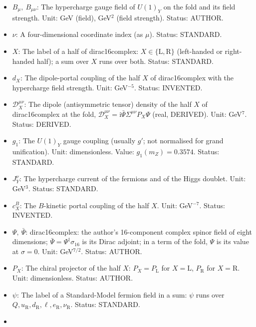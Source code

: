 \documentclass[
  10pt,
]{article}
\begin{document}
\begin{itemize}
  \(W\) and \(B\)): the gauge couplings at the fold are divided by the
  square root of the portal factor. Unit: dimensionless. Value: 1 where
  dirac16complex vanishes. Status: DERIVED.
\item
  \(B_\mu,\ B_{\mu\nu}\): The hypercharge gauge field of \(U(1)_Y\) on
  the fold and its field strength. Unit: GeV (field), GeV\(^2\) (field
  strength). Status: AUTHOR.
\item
  \(\nu\): A four-dimensional coordinate index (as \(\mu\)). Status:
  STANDARD.
\item
  \(X\): The label of a half of dirac16complex:
  \(X \in \{\mathrm{L}, \mathrm{R}\}\) (left-handed or right-handed
  half); a sum over \(X\) runs over both. Status: STANDARD.
\item
  \(d_X\): The dipole-portal coupling of the half \(X\) of
  dirac16complex with the hypercharge field strength. Unit:
  GeV\(^{-5}\). Status: INVENTED.
\item
  \(\mathcal{D}_X^{\mu\nu}\): The dipole (antisymmetric tensor) density
  of the half \(X\) of dirac16complex at the fold,
  \(\mathcal{D}_X^{\mu\nu} = \mathrm{i}\bar\Psi\Sigma^{\mu\nu}P_X\Psi\)
  (real, DERIVED). Unit: GeV\(^7\). Status: DERIVED.
\item
  \(g_1\): The \(U(1)_Y\) gauge coupling (usually \(g'\); not normalised
  for grand unification). Unit: dimensionless. Value:
  \(g_1(m_Z) = 0.3574\). Status: STANDARD.
\item
  \(J_Y^\nu\): The hypercharge current of the fermions and of the Higgs
  doublet. Unit: GeV\(^3\). Status: STANDARD.
\item
  \(c^{B}_X\): The \(B\)-kinetic portal coupling of the half \(X\).
  Unit: GeV\(^{-7}\). Status: INVENTED.
\item
  \(\Psi,\ \bar\Psi\): dirac16complex: the author's 16-component complex
  spinor field of eight dimensions;
  \(\bar\Psi = \Psi^\dagger\sigma_{16}\) is its Dirac adjoint; in a term
  of the fold, \(\Psi\) is its value at \(\sigma = 0\). Unit:
  GeV\(^{7/2}\). Status: AUTHOR.
\item
  \(P_X\): The chiral projector of the half \(X\):
  \(P_X = P_{\mathrm{L}}\) for \(X = \mathrm{L}\), \(P_{\mathrm{R}}\)
  for \(X = \mathrm{R}\). Unit: dimensionless. Status: AUTHOR.
\item
  \(\psi\): The label of a Standard-Model fermion field in a sum:
  \(\psi\) runs over
  \(Q, u_{\mathrm{R}}, d_{\mathrm{R}}, \ell, e_{\mathrm{R}}, \nu_{\mathrm{R}}\).
  Status: STANDARD.
\item

\end{itemize}
\end{document}
